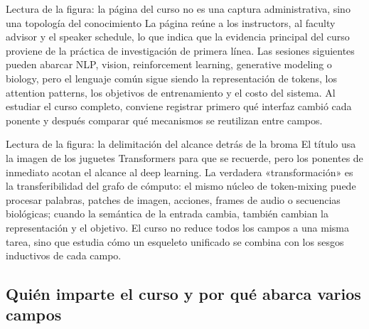 
\begin{knowledgebox}{Lectura de la figura: la página del curso no es una captura administrativa, sino una topología del conocimiento}
La página reúne a los instructors, al faculty advisor y el speaker schedule, lo que indica que la evidencia principal del curso proviene de la práctica de investigación de primera línea. Las sesiones siguientes pueden abarcar NLP, vision, reinforcement learning, generative modeling o biology, pero el lenguaje común sigue siendo la representación de tokens, los attention patterns, los objetivos de entrenamiento y el costo del sistema. Al estudiar el curso completo, conviene registrar primero qué interfaz cambió cada ponente y después comparar qué mecanismos se reutilizan entre campos.
\end{knowledgebox}


\begin{knowledgebox}{Lectura de la figura: la delimitación del alcance detrás de la broma}
El título usa la imagen de los juguetes Transformers para que se recuerde, pero los ponentes de inmediato acotan el alcance al deep learning. La verdadera «transformación» es la transferibilidad del grafo de cómputo: el mismo núcleo de token-mixing puede procesar palabras, patches de imagen, acciones, frames de audio o secuencias biológicas; cuando la semántica de la entrada cambia, también cambian la representación y el objetivo. El curso no reduce todos los campos a una misma tarea, sino que estudia cómo un esqueleto unificado se combina con los sesgos inductivos de cada campo.
\end{knowledgebox}


\subsection{Quién imparte el curso y por qué abarca varios campos}

